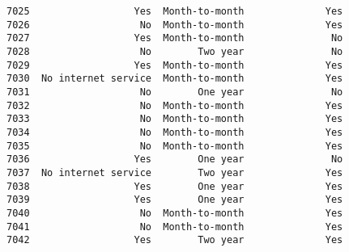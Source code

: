 \documentclass[11pt]{article}
\begin{document}
\begin{tcolorbox}[breakable, boxrule=.5pt, size=fbox, pad at break*=1mm, opacityfill=0]
\begin{Verbatim}[commandchars=\\\{\}]
7025                  Yes  Month-to-month              Yes
7026                   No  Month-to-month              Yes
7027                  Yes  Month-to-month               No
7028                   No        Two year               No
7029                  Yes  Month-to-month              Yes
7030  No internet service  Month-to-month              Yes
7031                   No        One year               No
7032                   No  Month-to-month              Yes
7033                   No  Month-to-month              Yes
7034                   No  Month-to-month              Yes
7035                   No  Month-to-month              Yes
7036                  Yes        One year               No
7037  No internet service        Two year              Yes
7038                  Yes        One year              Yes
7039                  Yes        One year              Yes
7040                   No  Month-to-month              Yes
7041                   No  Month-to-month              Yes
7042                  Yes        Two year              Yes


\end{Verbatim}
\end{tcolorbox}
\end{document}
